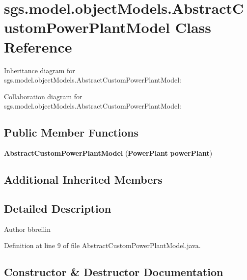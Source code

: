 \section{sgs.\-model.\-object\-Models.\-Abstract\-Custom\-Power\-Plant\-Model Class Reference}
\label{classsgs_1_1model_1_1object_models_1_1_abstract_custom_power_plant_model}


Inheritance diagram for sgs.\-model.\-object\-Models.\-Abstract\-Custom\-Power\-Plant\-Model\-:


Collaboration diagram for sgs.\-model.\-object\-Models.\-Abstract\-Custom\-Power\-Plant\-Model\-:
\subsection*{Public Member Functions}
\begin{DoxyCompactItemize}
\item 
{\bf Abstract\-Custom\-Power\-Plant\-Model} ({\bf Power\-Plant} {\bf power\-Plant})
\end{DoxyCompactItemize}
\subsection*{Additional Inherited Members}


\subsection{Detailed Description}
\begin{DoxyAuthor}{Author}
bbreilin 
\end{DoxyAuthor}


Definition at line 9 of file Abstract\-Custom\-Power\-Plant\-Model.\-java.



\subsection{Constructor \& Destructor Documentation}
